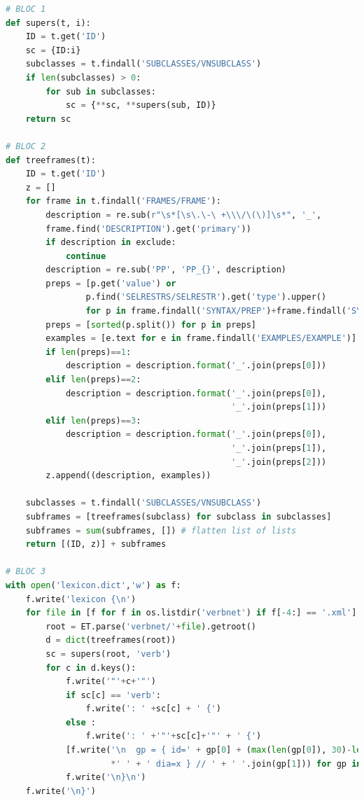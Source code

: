 \begin{lstlisting}[language=Python, caption = code pour lexicon.dict]
# BLOC 1
def supers(t, i):
    ID = t.get('ID')
    sc = {ID:i}
    subclasses = t.findall('SUBCLASSES/VNSUBCLASS')
    if len(subclasses) > 0:
        for sub in subclasses:
            sc = {**sc, **supers(sub, ID)}
    return sc
		
# BLOC 2
def treeframes(t):
    ID = t.get('ID')
    z = []
    for frame in t.findall('FRAMES/FRAME'):
        description = re.sub(r"\s*[\s\.\-\ +\\\/\(\)]\s*", '_', 
        frame.find('DESCRIPTION').get('primary'))
        if description in exclude:
            continue
        description = re.sub('PP', 'PP_{}', description)
        preps = [p.get('value') or 
                p.find('SELRESTRS/SELRESTR').get('type').upper() 
                for p in frame.findall('SYNTAX/PREP')+frame.findall('SYNTAX/LEX')]
        preps = [sorted(p.split()) for p in preps]     
        examples = [e.text for e in frame.findall('EXAMPLES/EXAMPLE')]
        if len(preps)==1:
            description = description.format('_'.join(preps[0]))
        elif len(preps)==2:
            description = description.format('_'.join(preps[0]),
                                             '_'.join(preps[1]))
        elif len(preps)==3:
            description = description.format('_'.join(preps[0]), 
                                             '_'.join(preps[1]), 
                                             '_'.join(preps[2]))
        z.append((description, examples))
        
    subclasses = t.findall('SUBCLASSES/VNSUBCLASS')
    subframes = [treeframes(subclass) for subclass in subclasses]
    subframes = sum(subframes, []) # flatten list of lists
    return [(ID, z)] + subframes
		
# BLOC 3
with open('lexicon.dict','w') as f:
    f.write('lexicon {\n')
    for file in [f for f in os.listdir('verbnet') if f[-4:] == '.xml']:
        root = ET.parse('verbnet/'+file).getroot()       
        d = dict(treeframes(root))
        sc = supers(root, 'verb')
        for c in d.keys():
            f.write('"'+c+'"')
            if sc[c] == 'verb':
                f.write(': ' +sc[c] + ' {')
            else :
                f.write(': ' +'"'+sc[c]+'"' + ' {')
            [f.write('\n  gp = { id=' + gp[0] + (max(len(gp[0]), 30)-len(gp[0]))
                     *' ' + ' dia=x } // ' + ' '.join(gp[1])) for gp in d[c]]
            f.write('\n}\n')
    f.write('\n}')
\end{lstlisting}

